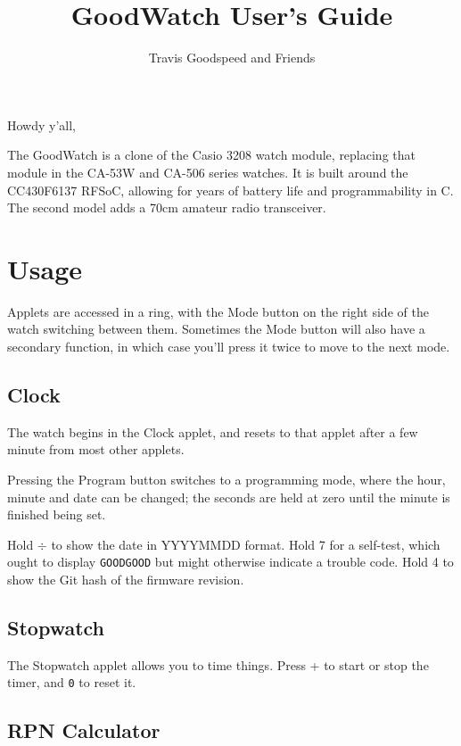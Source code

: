 \documentclass{article}
\begin{document}


\title{GoodWatch User's Guide}
\author{Travis Goodspeed and Friends}
\maketitle


\begin{multicols}{2}
\noindent
Howdy y'all,

The GoodWatch is a clone of the Casio 3208 watch module, replacing
that module in the CA-53W and CA-506 series watches.  It is built
around the CC430F6137 RFSoC, allowing for years of battery life and
programmability in C.  The second model adds a 70cm amateur radio
transceiver.

\section{Usage}

Applets are accessed in a ring, with the Mode button on the right side
of the watch switching between them.  Sometimes the Mode button will
also have a secondary function, in which case you'll press it twice to
move to the next mode.

\subsection*{Clock}

The watch begins in the Clock applet, and resets to that applet after
a few minute from most other applets.

Pressing the Program button switches to a programming mode, where the
hour, minute and date can be changed; the seconds are held at zero
until the minute is finished being set.

Hold $\div$ to show the date in YYYYMMDD format.  Hold 7 for a
self-test, which ought to display {\tt GOODGOOD} but might otherwise
indicate a trouble code.  Hold 4 to show the Git hash of the firmware
revision.

\subsection*{Stopwatch}

The Stopwatch applet allows you to time things.  Press + to start or
stop the timer, and {\tt 0} to reset it.

\subsection*{RPN Calculator}


\end{multicols}
\end{document}
